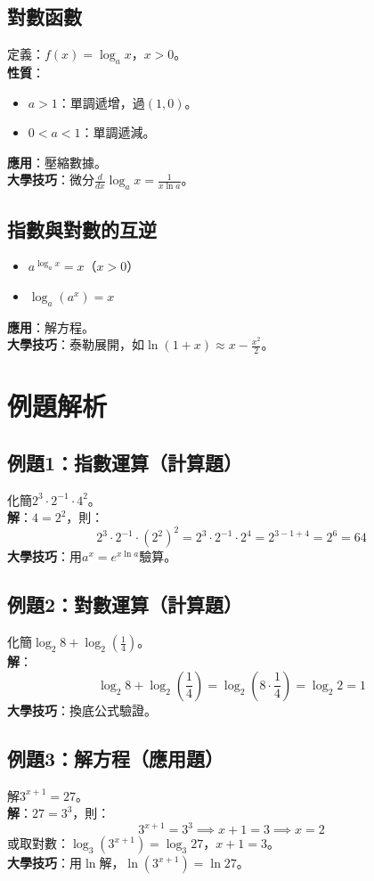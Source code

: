 \subsection{對數函數}
定義：$f(x) = \log_a x$，$x > 0$。\\
\textbf{性質}：
\begin{itemize}
    \item $a > 1$：單調遞增，過$(1, 0)$。
    \item $0 < a < 1$：單調遞減。
\end{itemize}
\textbf{應用}：壓縮數據。\\
\textbf{大學技巧}：微分$\frac{d}{dx} \log_a x = \frac{1}{x \ln a}$。

\subsection{指數與對數的互逆}
\begin{itemize}
    \item $a^{\log_a x} = x$（$x > 0$）
    \item $\log_a (a^x) = x$
\end{itemize}
\textbf{應用}：解方程。\\
\textbf{大學技巧}：泰勒展開，如$\ln(1+x) \approx x - \frac{x^2}{2}$。

\section{例題解析}

\subsection{例題1：指數運算（計算題）}
化簡$2^3 \cdot 2^{-1} \cdot 4^2$。\\
\textbf{解}：$4 = 2^2$，則：
\[
2^3 \cdot 2^{-1} \cdot (2^2)^2 = 2^3 \cdot 2^{-1} \cdot 2^4 = 2^{3-1+4} = 2^6 = 64
\]
\textbf{大學技巧}：用$a^x = e^{x \ln a}$驗算。

\subsection{例題2：對數運算（計算題）}
化簡$\log_2 8 + \log_2 \left(\frac{1}{4}\right)$。\\
\textbf{解}：
\[
\log_2 8 + \log_2 \left(\frac{1}{4}\right) = \log_2 (8 \cdot \frac{1}{4}) = \log_2 2 = 1
\]
\textbf{大學技巧}：換底公式驗證。

\subsection{例題3：解方程（應用題）}
解$3^{x+1} = 27$。\\
\textbf{解}：$27 = 3^3$，則：
\[
3^{x+1} = 3^3 \implies x + 1 = 3 \implies x = 2
\]
或取對數：$\log_3 (3^{x+1}) = \log_3 27$，$x + 1 = 3$。\\
\textbf{大學技巧}：用$\ln$解，$\ln (3^{x+1}) = \ln 27$。

